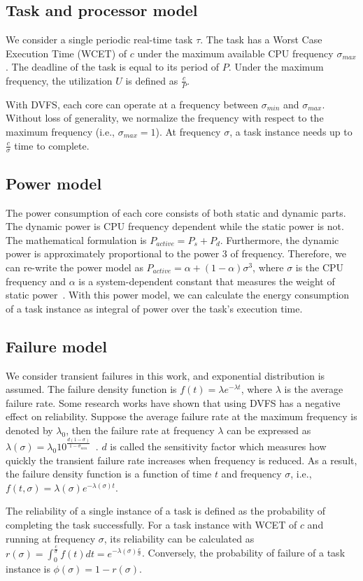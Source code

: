 \subsection{Task and processor model}
We consider a single periodic real-time task $\tau$. The task has a Worst Case Execution Time (WCET) of $c$ under the maximum available CPU frequency $\sigma_{max}$. The deadline of the task is equal to its period of $P$. Under the maximum frequency, the utilization $U$ is defined as $\frac{c}{P}$. 

With DVFS, each core can operate at a frequency between $\sigma_{min}$ and $\sigma_{max}$. 
Without loss of generality, we normalize the frequency with respect to the maximum frequency (i.e., $\sigma_{max} = 1$). At frequency $
\sigma$, a task instance needs up to $\frac{c}{\sigma}$ time to complete. 


\subsection{Power model}
The power consumption of each core consists of both static and dynamic parts. The dynamic power is CPU frequency dependent while the static power is not. The mathematical formulation is $P_{active} = P_s + P_d$. Furthermore, the dynamic power is approximately proportional to the power 3 of frequency. Therefore, we can re-write the power model as  $P_{active} = \alpha + (1-\alpha) \sigma^3$, where $\sigma$ is the CPU frequency and $\alpha$ is a system-dependent constant that measures the weight of static power~\cite{cui2014shadow}. 
With this power model, we can calculate the energy consumption of a task instance as integral of power over the task's execution time. 

\subsection{Failure model}
We consider transient failures in this work, and exponential distribution is assumed. The failure density function is $f(t) = \lambda e^{-\lambda t}$, where $\lambda$ is the average failure rate. Some research works have shown that using DVFS has a negative effect on reliability. Suppose the average failure rate at the maximum frequency is denoted by $\lambda_0$, then the failure rate at frequency $\lambda$ can be expressed as $\lambda(\sigma) = \lambda_0 10^{\frac{d(1-\sigma)}{1-\sigma_{min}}}$~\cite{1382539}. $d$ is called the sensitivity factor which measures how quickly the transient failure rate increases when frequency is reduced. 
As a result, the failure density function is a function of time $t$ and frequency $\sigma$, i.e., $f(t, \sigma) = \lambda(\sigma) e^{-\lambda(\sigma)t}$.


The reliability of a single instance of a task is defined as the probability of completing the task successfully. For a task instance with WCET of $c$ and running at frequency $\sigma$, its reliability can be calculated as $r(\sigma) = \int_0^{\frac{c}{\sigma}} f(t)dt=e^{-\lambda(\sigma)\frac{c}{\sigma}}$.
Conversely, the probability of failure of a task instance is $\phi(\sigma) = 1 - r(\sigma)$. 


